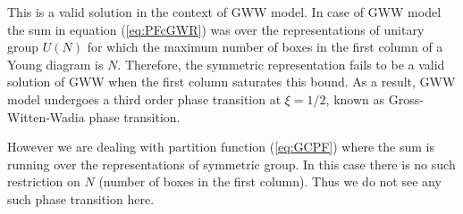 \documentclass[final,3p,12pt,times]{elsarticle}
\numberwithin{equation}{section}
\begin{document}
This is a valid solution in the context of GWW model. In case of GWW model the sum in equation (\ref{eq:PFcGWR}) was over the representations of unitary group $U(N)$ for which the maximum number of boxes in the first column of a Young diagram is $N$. Therefore, the symmetric representation fails to be a valid solution of GWW when the first column saturates this bound. As a result, GWW model undergoes a third order phase transition at $\xi=1/2$, known as Gross-Witten-Wadia phase transition.

However we are dealing with partition function (\ref{eq:GCPF}) where the sum is running over the representations of symmetric group. In this case there is no such restriction on $N$ (number of boxes in the first column). Thus we do not see any such phase transition here.




\end{document}
